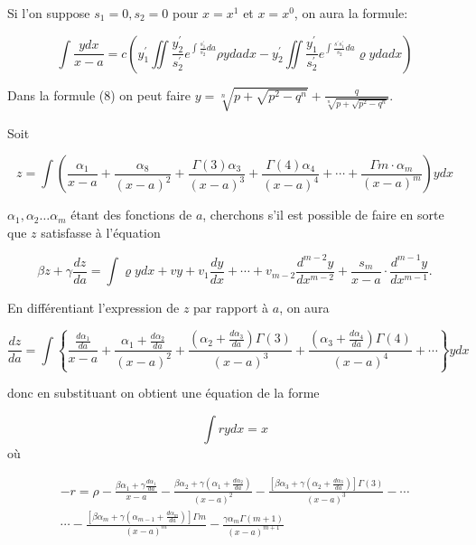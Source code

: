 \documentclass{article}
\begin{document}
Si l'on suppose \(s_{1}=0, s_{2}=0\) pour \(x=x^{1}\) et \(x=x^{0}\), on aura la formule:

\[
\int \frac{y d x}{x-a}=c\left(y_{1}^{\prime} \iint \frac{y_{2}^{\prime}}{s_{2}^{\prime}} e^{\int \frac{s_{1}^{\prime}}{s_{2}^{\prime}} d a} \rho y d a d x-y_{2}^{\prime} \iint \frac{y_{1}^{\prime}}{s_{2}^{\prime}} e^{\int \frac{s^{\prime} s_{1}^{\prime}}{s_{2}^{\prime}} d a} \varrho y d a d x\right)
\]

Dans la formule (8) on peut faire \(y=\sqrt[n]{p+\sqrt{p^{2}-q^{n}}}+\frac{q}{\sqrt[n]{p+\sqrt{p^{2}-q^{n}}}}\).

Soit

\[
z=\int\left(\frac{\alpha_{1}}{x-a}+\frac{\alpha_{8}}{(x-a)^{2}}+\frac{\Gamma(3) \alpha_{3}}{(x-a)^{3}}+\frac{\Gamma(4) \alpha_{4}}{(x-a)^{4}}+\cdots+\frac{\Gamma m \cdot \alpha_{m}}{(x-a)^{m}}\right) y d x
\]

\(\alpha_{1}, \alpha_{2} \ldots \alpha_{m}\) étant des fonctions de \(a\), cherchons s'il est possible de faire en sorte que \(z\) satisfasse à l'équation

\[
\beta z+\gamma \frac{d z}{d a}=\int \varrho y d x+v y+v_{1} \frac{d y}{d x}+\cdots+v_{m-2} \frac{d^{m-2} y}{d x^{m-2}}+\frac{s_{m}}{x-a} \cdot \frac{d^{m-1} y}{d x^{m-1}} .
\]

En différentiant l'expression de \(z\) par rapport à \(a\), on aura

\[
\frac{d z}{d a}=\int\left\{\frac{\frac{d \alpha_{1}}{d a}}{x-a}+\frac{\alpha_{1}+\frac{d \alpha_{2}}{d a}}{(x-a)^{2}}+\frac{\left(\alpha_{2}+\frac{d \alpha_{3}}{d a}\right) \Gamma(3)}{(x-a)^{3}}+\frac{\left(\alpha_{3}+\frac{d \alpha_{4}}{d a}\right) \Gamma(4)}{(x-a)^{4}}+\cdots\right\} y d x
\]

donc en substituant on obtient une équation de la forme

\[
\int r y d x=x
\]
où

\[
\begin{gathered}
-r=\rho-\frac{\beta \alpha_{1}+\gamma \frac{d \alpha_{1}}{d a}}{x-a}-\frac{\beta \alpha_{2}+\gamma\left(\alpha_{1}+\frac{d \alpha_{2}}{d a}\right)}{(x-a)^{2}}-\frac{\left[\beta \alpha_{3}+\gamma\left(\alpha_{2}+\frac{d \alpha_{3}}{d a}\right)\right] \Gamma(3)}{(x-a)^{3}}-\cdots \\
\cdots-\frac{\left[\beta \alpha_{m}+\gamma\left(\alpha_{m-1}+\frac{d \alpha_{m}}{d a}\right)\right] \Gamma m}{(x-a)^{m}}-\frac{\gamma \alpha_{m} \Gamma(m+1)}{(x-a)^{m+1}}
\end{gathered}
\]
\end{document}
